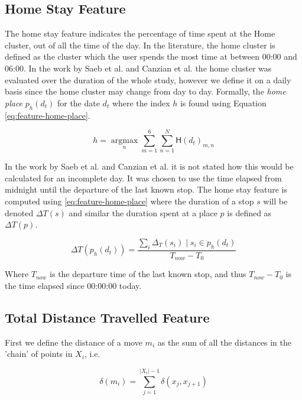 \subsection{Home Stay Feature}
The home stay feature indicates the percentage of time spent at the Home cluster, out of all the time of the day. In the literature, the home cluster is defined as the cluster which the user spends the most time at between 00:00 and 06:00. In the work by Saeb et al. and Canzian et al. \cite{Saeb2015, saeb2016, Canzian2015} the home cluster was evaluated over the duration of the whole study, however we define it on a daily basis since the home cluster may change from day to day. Formally, the \textit{home place} $p_h (d_t)$ for the date $d_t$ where the index $h$ is found using Equation \eqref{eq:feature-home-place}.

\begin{equation}
\label{eq:feature-home-place}
h = \operatorname*{argmax}_n \sum_{m=1}^{6} \sum_{n=1}^{N}  \mathsf{H}(d_t)_{m,n}
\end{equation}

In the work by Saeb et al. \cite{Saeb2015} and Canzian et al.\cite{Canzian2015} it is not stated how this would be calculated for an incomplete day. It was chosen to  use the time elapsed from midnight until the departure of the last known stop. The home stay feature is computed using \eqref{eq:feature-home-place} where the duration of a stop $s$ will be denoted $\Delta T (s)$ and similar the duration spent at a place $p$ is defined as $\Delta T (p)$.

\begin{equation}
\label{eq:feature-home-place}
\Delta T(p_{h} (d_t) )= \frac{\sum_i \Delta_T (s_i) \;|\; s_i \in p_h (d_t)}{T_{now} - T_{0}}
\end{equation}

Where $T_{now}$ is the departure time of the last known stop, and thus $T_{now} - T_0$ is the time elapsed since 00:00:00 today.

\subsection{Total Distance Travelled Feature}
First we define the distance of a move $m_i$ as the sum of all the distances in the 'chain' of points in $X_i$, i.e.

\begin{equation}
\label{eq:feature-move-computation}
\delta (m_i)  = \sum_{j=1}^{|X_i|-1} \delta (x_j, x_{j+1})
\end{equation}

